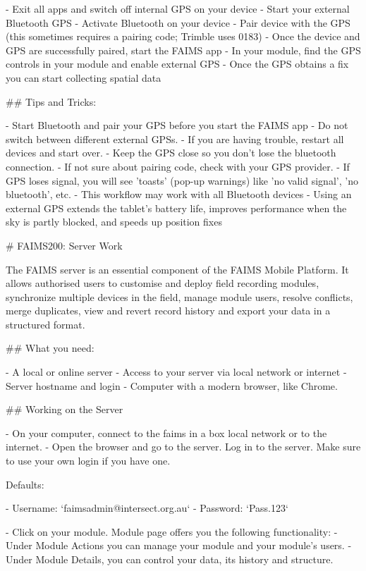 -  Exit all apps and switch off internal GPS on your device
-  Start your external Bluetooth GPS
-  Activate Bluetooth on your device
-  Pair device with the GPS (this sometimes requires a pairing code; Trimble uses 0183)
-  Once the device and GPS are successfully paired, start the FAIMS app
-  In your module, find the GPS controls in your module and enable external GPS
-  Once the GPS obtains a fix you can start collecting spatial data




## Tips and Tricks:

-  Start Bluetooth and pair your GPS before you start the FAIMS app
-  Do not switch between different external GPSs.
-  If you are having trouble, restart all devices and start over.
-  Keep the GPS close so you don’t lose the bluetooth connection.
-  If not sure about pairing code, check with your GPS provider.
-  If GPS loses signal, you will see 'toasts' (pop-up warnings) like 'no valid signal', 'no bluetooth', etc.
-  This workflow may work with all Bluetooth devices
-  Using an external GPS extends the tablet’s battery life, improves performance when the sky is partly blocked, and speeds up position fixes






# FAIMS200: Server Work


The FAIMS server is an essential component of the FAIMS Mobile Platform. It allows authorised users to customise and deploy field recording modules, synchronize multiple devices in the field, manage module users, resolve conflicts, merge duplicates, view and revert record history and export your data in a structured format.

## What you need:

-  A local or online server
-  Access to your server via local network or internet
-  Server hostname and login
-  Computer with a modern browser, like Chrome.


## Working on the Server

-  On your computer, connect to the faims in a box local network or to the internet.
-  Open the browser and go to the server. Log in to the server. Make sure to use your own login if you have one.

  Defaults:

-   Username: `faimsadmin@intersect.org.au`
-   Password: `Pass.123`

-  Click on your module. Module page offers you the following functionality:
	-  Under Module Actions you can manage your module and your module's users.
	-  Under Module Details, you can control your data, its history and structure.





